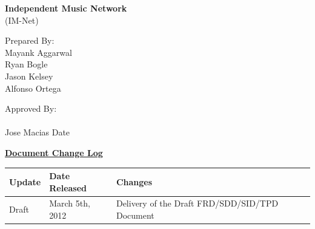 \documentclass[letterpaper,12pt]{article}
\begin{document}


\begin{center}
{\Large \textbf{Independent Music Network}}\\
(IM-Net)\\
\end{center}

\vspace{3cm}
Prepared By:\\
Mayank Aggarwal\\
Ryan Bogle\\
Jason Kelsey\\
Alfonso Ortega

\vspace{2cm}
Approved By:\\
\vspace{2cm}
\makebox[2in]{\hrulefill}
\hspace{0.5cm}
\makebox[2in]{\hrulefill}\\
Jose Macias
\hspace{1.36in}
Date

\eject

\begin{center}
\underline{\textbf{Document Change Log}}
\end{center}
\begin{tabular}{|l|l|p{5in}|}
\hline 
\textbf{Update} & \textbf{Date Released} & \textbf{Changes} \\ 
\hline 
Draft & March 5th, 2012 & Delivery of the Draft FRD/SDD/SID/TPD Document \\ 
\hline 
\end{tabular} 

\eject


\tableofcontents
\listoffigures

\eject
\end{document}
